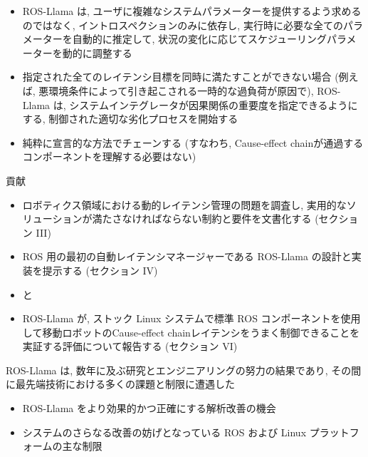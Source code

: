 \begin{frame}{}
    \begin{itemize}
        \item ROS-Llama は, ユーザに複雑なシステムパラメーターを提供するよう求めるのではなく, イントロスペクションのみに依存し, 実行時に必要な全てのパラメーターを自動的に推定して, 状況の変化に応じてスケジューリングパラメーターを動的に調整する
        \item 指定された全てのレイテンシ目標を同時に満たすことができない場合 (例えば, 悪環境条件によって引き起こされる一時的な過負荷が原因で), ROS-Llama は, システムインテグレータが因果関係の重要度を指定できるようにする, 制御された適切な劣化プロセスを開始する
        \item 純粋に宣言的な方法でチェーンする (すなわち, Cause-effect chainが通過するコンポーネントを理解する必要はない)
    \end{itemize}
\end{frame}

\begin{frame}{貢献}
    \begin{itemize}
        \item  ロボティクス領域における動的レイテンシ管理の問題を調査し, 実用的なソリューションが満たさなければならない制約と要件を文書化する (セクション III)

        \item  ROS 用の最初の自動レイテンシマネージャーである ROS-Llama の設計と実装を提示する (セクション IV)
        \item と

        \item  ROS-Llama が, ストック Linux システムで標準 ROS コンポーネントを使用して移動ロボットのCause-effect chainレイテンシをうまく制御できることを実証する評価について報告する (セクション VI)

    \end{itemize}
\end{frame}

\begin{frame}{}
    ROS-Llama は, 数年に及ぶ研究とエンジニアリングの努力の結果であり, その間に最先端技術における多くの課題と制限に遭遇した

    \begin{itemize}
        \item  ROS-Llama をより効果的かつ正確にする解析改善の機会

        \item  システムのさらなる改善の妨げとなっている ROS および Linux プラットフォームの主な制限

    \end{itemize}
\end{frame}
